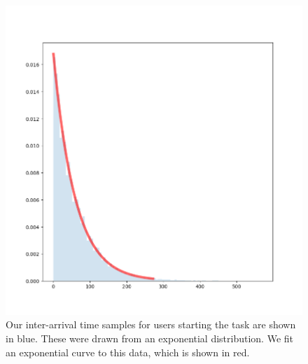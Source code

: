 \begin{figure}[H]
  \includegraphics[width=\textwidth]{figures/montecarlo/arrival_times.png}
  \caption{
    Our inter-arrival time samples for users starting the task are shown in
    blue.
    These were drawn from an exponential distribution.
    We fit an exponential curve to this data, which is shown in red.
  }\label{fig:arrival_times}
\end{figure}

